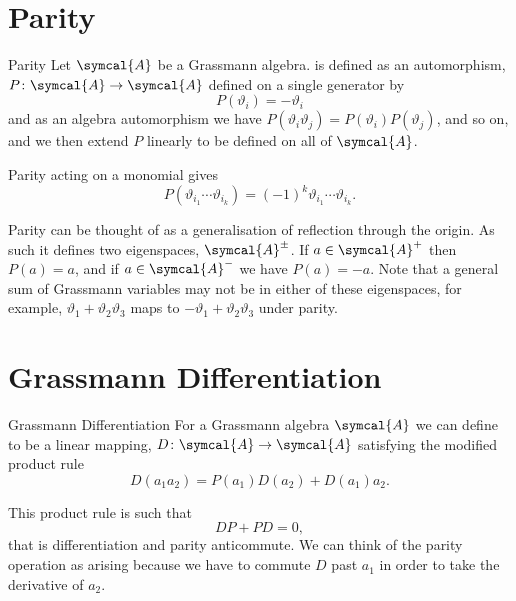 \section{Parity}
\begin{dfn}{Parity}{}
    Let \(\symcal{A}\) be a Grassmann algebra.
     is defined as an automorphism, \(P \colon \symcal{A} \to \symcal{A}\) defined on a single generator by
    \begin{equation}
        P(\vartheta_i) = -\vartheta_i
    \end{equation}
    and as an algebra automorphism we have \(P(\vartheta_i\vartheta_j) = P(\vartheta_i)P(\vartheta_j)\), and so on, and we then extend \(P\) linearly to be defined on all of \(\symcal{A}\).
    
    Parity acting on a monomial gives
    \begin{equation}
        P(\vartheta_{i_1} \dotsm \vartheta_{i_k}) = (-1)^{k} \vartheta_{i_1} \dotsm \vartheta_{i_k}.
    \end{equation}
\end{dfn}

Parity can be thought of as a generalisation of reflection through the origin.
As such it defines two eigenspaces, \(\symcal{A}^{\pm}\).
If \(a \in \symcal{A}^+\) then \(P(a) = a\), and if \(a \in \symcal{A}^-\) we have \(P(a) = -a\).
Note that a general sum of Grassmann variables may not be in either of these eigenspaces, for example, \(\vartheta_1 + \vartheta_2\vartheta_3\) maps to \(-\vartheta_1 + \vartheta_2\vartheta_3\) under parity.

\section{Grassmann Differentiation}
\begin{dfn}{Grassmann Differentiation}{}
    For a Grassmann algebra \(\symcal{A}\) we can define  to be a linear mapping, \(D \colon \symcal{A} \to \symcal{A}\) satisfying the modified product rule
    \begin{equation}
        D(a_1a_2) = P(a_1)D(a_2) + D(a_1)a_2.
    \end{equation}
\end{dfn}
This product rule is such that
\begin{equation}
    DP + PD = 0,
\end{equation}
that is differentiation and parity anticommute.
We can think of the parity operation as arising because we have to commute \(D\) past \(a_1\) in order to take the derivative of \(a_2\).

